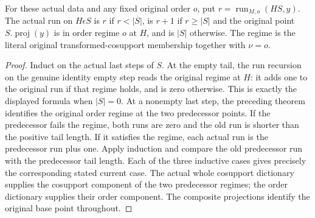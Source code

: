 \begin{theorem}
\label{hir:original-interior-empty-order-regime-run}
\leanok
{}
For these actual data and any fixed original order $o$, put
$r=\operatorname{run}_{M,o}(HS,y)$.  The actual run on $H\epsilon S$
is $r$ if $r<|S|$, is $r+1$ if $r\geq|S|$ and the original point
$S.\operatorname{proj}(y)$ is in order regime $o$ at $H$, and is $|S|$
otherwise.  The regime is the literal original transformed-cosupport
membership together with $\nu=o$.
\end{theorem}
\begin{proof}
Induct on the actual last steps of $S$.  At the empty tail, the run
recursion on the genuine identity empty step reads the original regime
at $H$: it adds one to the original run if that regime holds, and is
zero otherwise.  This is exactly the displayed formula when $|S|=0$.
At a nonempty last step, the preceding theorem identifies the original
order regime at the two predecessor points.  If the predecessor fails
the regime, both runs are zero and the old run is shorter than the
positive tail length.  If it satisfies the regime, each actual run is
the predecessor run plus one.  Apply induction and compare the old
predecessor run with the predecessor tail length.  Each of the three
inductive cases gives precisely the corresponding stated current case.
The actual whole cosupport dictionary supplies the cosupport component
of the two predecessor regimes; the order dictionary supplies their
order component.  The composite projections identify the original base
point throughout.
\end{proof}


